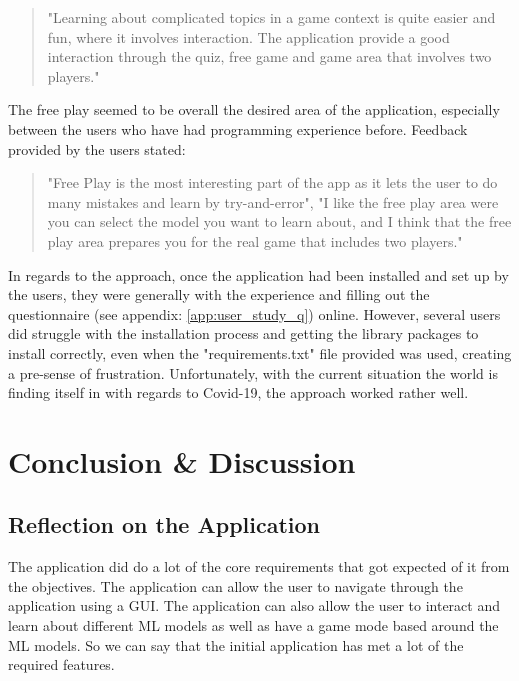 	\begin{quote}
		\begin{changebar}
			"Learning about complicated topics in a game context is quite easier and fun, where it involves interaction. The application provide a good interaction through the quiz, free game and game area that involves two players." 
		\end{changebar}
	\end{quote}

	The free play seemed to be overall the desired area of the application, especially between the users who have had programming experience before. Feedback provided by the users stated:

	\begin{quote}
		\begin{changebar}
			"Free Play is the most interesting part of the app as it lets the user to do many mistakes and learn by try-and-error", "I like the free play area were you can select the model you want to learn about, and I think that the free play area prepares you for the real game that includes two players."
		\end{changebar}
	\end{quote}


	In regards to the approach, once the application had been installed and set up by the users, they were generally with the experience and filling out the questionnaire (see appendix: \ref{app:user_study_q}) online. However, several users did struggle with the installation process and getting the library packages to install correctly, even when the "requirements.txt" file provided was used, creating a pre-sense of frustration. Unfortunately, with the current situation the world is finding itself in with regards to Covid-19, the approach worked rather well.	


\chapter{Conclusion \& Discussion}
	\section{Reflection on the Application}
		The application did do a lot of the core requirements that got expected of it from the objectives. The application can allow the user to navigate through the application using a GUI. The application can also allow the user to interact and learn about different ML models as well as have a game mode based around the ML models. So we can say that the initial application has met a lot of the required features. 
		
